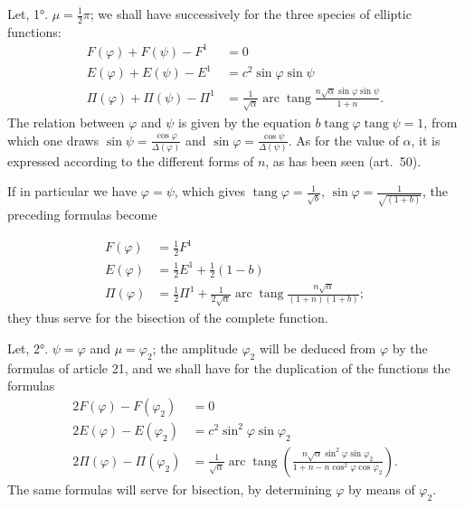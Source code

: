 \documentclass{article}
\begin{document}
Let, 1°. $\mu=\frac{1}{2}\pi$; we shall have successively for the three species of elliptic functions:
\[ \begin{aligned} F(\varphi)+F(\psi)-F^{1}&=0\\ E(\varphi)+E(\psi)-E^{1}&=c^{2}\sin\varphi\sin\psi\\ \Pi(\varphi)+\Pi(\psi)-\Pi^{1}&=\frac{1}{\sqrt{\alpha}}\operatorname{arc}\operatorname{tang}\frac{n\sqrt{\alpha}\sin\varphi\sin\psi}{1+n}. \end{aligned} \]
The relation between $\varphi$ and $\psi$ is given by the equation $b\operatorname{tang}\varphi\operatorname{tang}\psi=1$, from which one draws $\sin\psi=\frac{\cos\varphi}{\Delta(\varphi)}$ and $\sin\varphi=\frac{\cos\psi}{\Delta(\psi)}$. As for the value of $\alpha$, it is expressed according to the different forms of $n$, as has been seen (art.\ 50).

If in particular we have $\varphi=\psi$, which gives $\operatorname{tang}\varphi=\frac{1}{\sqrt{b}}$, $\sin\varphi=\frac{1}{\sqrt{(1+b)}}$, the preceding formulas become

\[ \begin{aligned} F(\varphi)&=\tfrac{1}{2}F^{1}\\ E(\varphi)&=\tfrac{1}{2}E^{1}+\tfrac{1}{2}(1-b)\\ \Pi(\varphi)&=\tfrac{1}{2}\Pi^{1}+\frac{1}{2\sqrt{\alpha}}\operatorname{arc}\operatorname{tang}\frac{n\sqrt{\alpha}}{(1+n)(1+b)}; \end{aligned} \]
they thus serve for the bisection of the complete function.

Let, 2°. $\psi=\varphi$ and $\mu=\varphi_{2}$; the amplitude $\varphi_{2}$ will be deduced from $\varphi$ by the formulas of article 21, and we shall have for the duplication of the functions the formulas
\[ \begin{aligned} 2F(\varphi)-F(\varphi_{2})&=0\\ 2E(\varphi)-E(\varphi_{2})&=c^{2}\sin^{2}\varphi\sin\varphi_{2}\\ 2\Pi(\varphi)-\Pi(\varphi_{2})&=\frac{1}{\sqrt{\alpha}}\operatorname{arc}\operatorname{tang}\left(\frac{n\sqrt{\alpha}\sin^{2}\varphi\sin\varphi_{2}}{1+n-n\cos^{2}\varphi\cos\varphi_{2}}\right). \end{aligned} \]
The same formulas will serve for bisection, by determining $\varphi$ by means of $\varphi_{2}$.
\end{document}
